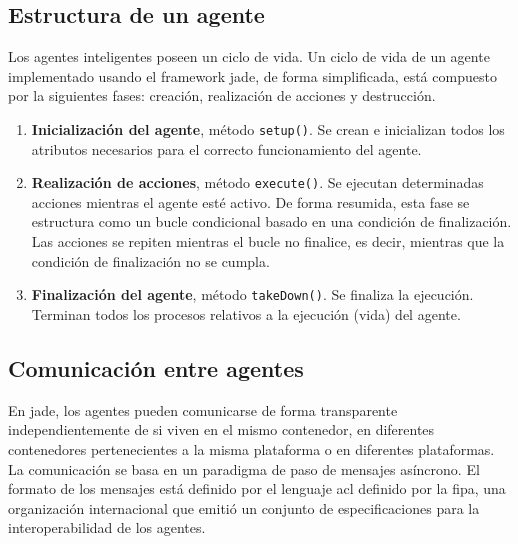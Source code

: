 \subsection{Estructura de un agente}
Los agentes inteligentes poseen un ciclo de vida. Un ciclo de vida de un agente implementado usando el framework \acrshort{jade}, de forma simplificada, está compuesto por la siguientes fases: creación, realización de acciones y destrucción.
\begin{enumerate}
    \item \textbf{Inicialización del agente}, método \lstinline{setup()}. Se crean e inicializan todos los atributos necesarios para el correcto funcionamiento del agente.
    \item \textbf{Realización de acciones}, método \lstinline{execute()}. Se ejecutan determinadas acciones mientras el agente esté activo. De forma resumida, esta fase se estructura como un bucle condicional basado en una condición de finalización. Las acciones se repiten mientras el bucle no finalice, es decir, mientras que la condición de finalización no se cumpla.
    \item \textbf{Finalización del agente}, método \lstinline{takeDown()}. Se finaliza la ejecución. Terminan todos los procesos relativos a la ejecución (vida) del agente.
\end{enumerate}

\subsection{Comunicación entre agentes}
En \acrshort{jade}, los agentes pueden comunicarse de forma transparente independientemente de si viven en el mismo contenedor, en diferentes contenedores pertenecientes a la misma plataforma o en diferentes plataformas. La comunicación se basa en un paradigma de paso de mensajes asíncrono. El formato de los mensajes está definido por el lenguaje \acrfull{acl} definido por la \acrfull{fipa}, una organización internacional que emitió un conjunto de especificaciones para la interoperabilidad de los agentes.

